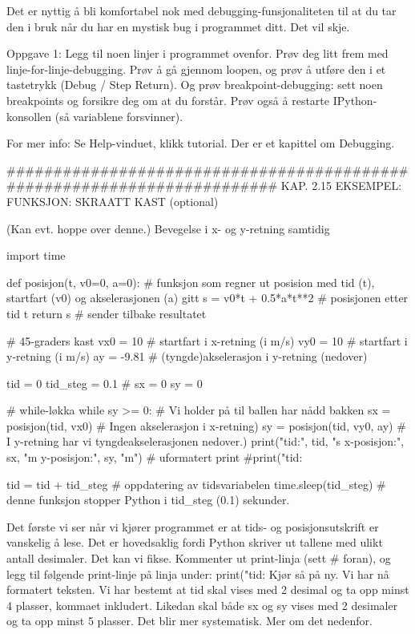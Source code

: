 {Det er nyttig å bli komfortabel nok med debugging-funsjonaliteten til at du
tar den i bruk når du har en mystisk bug i programmet ditt.
Det vil skje. 




Oppgave 1: Legg til noen linjer i programmet ovenfor.
Prøv deg litt frem med linje-for-linje-debugging. 
Prøv å gå gjennom loopen, og prøv å utføre den i et tastetrykk (Debug / Step Return). 
Og prøv breakpoint-debugging: sett noen breakpoints og forsikre deg om at du forstår. 
Prøv også å restarte IPython-konsollen (så variablene forsvinner). 


For mer info: Se Help-vinduet, klikk tutorial. Der er et kapittel om Debugging.

######################################################################## 
KAP. 2.15  EKSEMPEL: FUNKSJON: SKRAATT KAST  (optional)

(Kan evt. hoppe over denne.)
Bevegelse i x- og y-retning samtidig


import time

def posisjon(t, v0=0, a=0):    # funksjon som regner ut posision med tid (t), startfart (v0) og akselerasjonen (a) gitt
    s = v0*t + 0.5*a*t**2      # posisjonen etter tid t
    return s                   # sender tilbake resultatet
    

# 45-graders kast
vx0 = 10         # startfart i x-retning (i m/s)
vy0 = 10         # startfart i y-retning (i m/s)
ay = -9.81       # (tyngde)akselerasjon i y-retning (nedover)

tid = 0
tid_steg = 0.1   # 
sx = 0
sy = 0

# while-løkka
while sy >= 0:                    # Vi holder på til ballen har nådd bakken 
    sx = posisjon(tid, vx0)       # Ingen akselerasjon i x-retning) 
    sy = posisjon(tid, vy0, ay)   # I y-retning har vi tyngdeakselerasjonen nedover.)
    print("tid:", tid, "s   x-posisjon:", sx, "m   y-posisjon:", sy, "m")              # uformatert print
    #print("tid: %

    tid = tid + tid_steg          # oppdatering av tidsvariabelen
    time.sleep(tid_steg)          # denne funksjon stopper Python i tid_steg (0.1) sekunder. 


Det første vi ser når vi kjører programmet er at tids- og posisjonsutskrift er vanskelig å lese.
Det er hovedsaklig fordi Python skriver ut tallene med ulikt antall desimaler.
Det kan vi fikse.
Kommenter ut print-linja (sett # foran), og legg til følgende print-linje på linja under:
print("tid: %
Kjør så på ny.
Vi har nå formatert teksten.
Vi har bestemt at tid skal vises med 2 desimal og ta opp minst 4 plasser, kommaet inkludert.
Likedan skal både sx og sy vises med 2 desimaler og ta opp minst 5 plasser.
Det blir mer systematisk. Mer om det nedenfor. 

}
